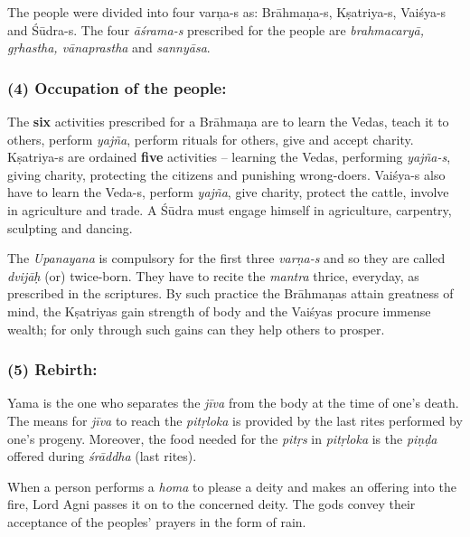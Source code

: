 \vskip -7.5pt

The people were divided into four varņa-s as: Brāhmaṇa-s, Kṣatriya-s, Vaiśya-s and Śūdra-s. The four \textit{āśrama-s} prescribed for the people are \textit{brahmacaryā, gṛhastha, vānaprastha} and \textit{sannyāsa}.


\subsubsection*{(4) Occupation of the people:}

\vskip -7pt

The \textbf{six} activities prescribed for a Brāhmaṇa are to learn the Vedas, teach it to others, perform \textit{yajña}, perform rituals for others, give and accept charity. Kṣatriya-s are ordained \textbf{five} activities – learning the Vedas, performing \textit{yajña-s}, giving charity, protecting the citizens and punishing wrong-doers. Vaiśya-s also have to learn the Veda-s, perform \textit{yajña}, give charity, protect the cattle, involve in agriculture and trade. A Śūdra must engage himself in agriculture, carpentry, sculpting and dancing.

The \textit{Upanayana} is compulsory for the first three \textit{varṇa-s} and so they are called \textit{dvijāḥ} (or) twice-born. They have to recite the \textit{mantra} thrice, everyday, as prescribed in the scriptures. By such practice the Brāhmaṇas attain greatness of mind, the Kṣatriyas gain strength of body and the Vaiśyas procure immense wealth; for only through such gains can they help others to prosper.


\subsubsection*{(5) Rebirth:}

\vskip -8pt

Yama is the one who separates the \textit{jīva} from the body at the time of one’s death. The means for \textit{jīva} to reach the \textit{pitṛloka} is provided by the last rites performed by one’s progeny. Moreover, the food needed for the \textit{pitṛs} in \textit{pitṛloka} is the \textit{piṇḍa} offered during \textit{śrāddha} (last rites).

When a person performs a \textit{homa} to please a deity and makes an offering into the fire, Lord Agni passes it on to the concerned deity. The gods convey their acceptance of the peoples’ prayers in the form of rain.


